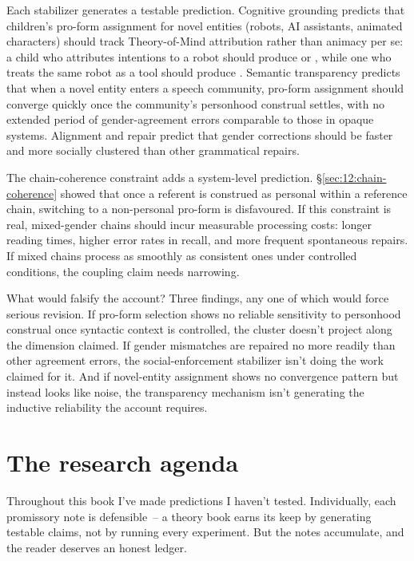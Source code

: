 Each stabilizer generates a testable prediction. Cognitive grounding predicts that children's pro-form assignment for novel entities (robots, AI assistants, animated characters) should track Theory-of-Mind attribution rather than animacy per se: a child who attributes intentions to a robot should produce  or , while one who treats the same robot as a tool should produce . Semantic transparency predicts that when a novel entity enters a speech community, pro-form assignment should converge quickly once the community's personhood construal settles, with no extended period of gender-agreement errors comparable to those in opaque systems. Alignment and repair predict that gender corrections should be faster and more socially clustered than other grammatical repairs.

The chain-coherence constraint adds a system-level prediction. §\ref{sec:12:chain-coherence} showed that once a referent is construed as personal within a reference chain, switching to a non-personal pro-form is disfavoured. If this constraint is real, mixed-gender chains should incur measurable processing costs: longer reading times, higher error rates in recall, and more frequent spontaneous repairs. If mixed chains process as smoothly as consistent ones under controlled conditions, the coupling claim needs narrowing.

What would falsify the account? Three findings, any one of which would force serious revision. If pro-form selection shows no reliable sensitivity to personhood construal once syntactic context is controlled, the cluster doesn't project along the dimension claimed. If gender mismatches are repaired no more readily than other agreement errors, the social-enforcement stabilizer isn't doing the work claimed for it. And if novel-entity assignment shows no convergence pattern but instead looks like noise, the transparency mechanism isn't generating the inductive reliability the account requires.

\section{The research agenda}
\label{sec:17:research-agenda}

Throughout this book I've made predictions I haven't tested. Individually, each promissory note is defensible~-- a theory book earns its keep by generating testable claims, not by running every experiment. But the notes accumulate, and the reader deserves an honest ledger.

